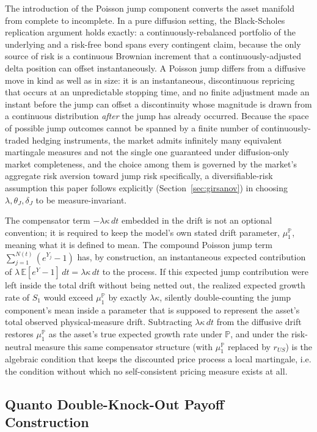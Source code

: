 \documentclass[11pt,a4paper]{article}
\begin{document}
The introduction of the Poisson jump component converts the asset manifold from complete to incomplete. In a pure diffusion setting, the Black-Scholes replication argument holds exactly: a continuously-rebalanced portfolio of the underlying and a risk-free bond spans every contingent claim, because the only source of risk is a continuous Brownian increment that a continuously-adjusted delta position can offset instantaneously. A Poisson jump differs from a diffusive move in kind as well as in size: it is an instantaneous, discontinuous repricing that occurs at an unpredictable stopping time, and no finite adjustment made an instant before the jump can offset a discontinuity whose magnitude is drawn from a continuous distribution \emph{after} the jump has already occurred. Because the space of possible jump outcomes cannot be spanned by a finite number of continuously-traded hedging instruments, the market admits infinitely many equivalent martingale measures and not the single one guaranteed under diffusion-only market completeness, and the choice among them is governed by the market's aggregate risk aversion toward jump risk specifically, a diversifiable-risk assumption this paper follows explicitly (Section~\ref{sec:girsanov}) in choosing $\lambda,\theta_J,\delta_J$ to be measure-invariant.

The compensator term $-\lambda\kappa\,dt$ embedded in the drift is not an optional convention; it is required to keep the model's own stated drift parameter, $\mu_1^{\mathbb P}$, meaning what it is defined to mean. The compound Poisson jump term $\sum_{j=1}^{N(t)}(e^{Y_j}-1)$ has, by construction, an instantaneous expected contribution of $\lambda\,\mathbb E[e^Y-1]\,dt=\lambda\kappa\,dt$ to the process. If this expected jump contribution were left inside the total drift without being netted out, the realized expected growth rate of $S_1$ would exceed $\mu_1^{\mathbb P}$ by exactly $\lambda\kappa$, silently double-counting the jump component's mean inside a parameter that is supposed to represent the asset's total observed physical-measure drift. Subtracting $\lambda\kappa\,dt$ from the diffusive drift restores $\mu_1^{\mathbb P}$ as the asset's true expected growth rate under $\mathbb P$, and under the risk-neutral measure this same compensator structure (with $\mu_1^{\mathbb P}$ replaced by $r_{US}$) is the algebraic condition that keeps the discounted price process a local martingale, i.e. the condition without which no self-consistent pricing measure exists at all.

\subsection{Quanto Double-Knock-Out Payoff Construction}
\label{sec:payoff}
\end{document}
